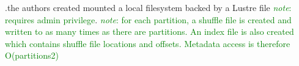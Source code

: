 \documentclass{report}
\newcommand{\note}[1]{\textcolor{green}{\textit{note}: #1}}
\begin{document}
	.the authors created mounted a local filesystem backed by a Lustre file \note{requires admin privilege}.
	\note{for each partition, a shuffle file is created and written to as many times as there are partitions. An index file is also created which contains shuffle file locations and offsets. Metadata access is therefore O(partitions2)}
	
	
	
	
	
	
	
	
	
	
	
	
	
	
	
	
	
	
	
\end{document}
